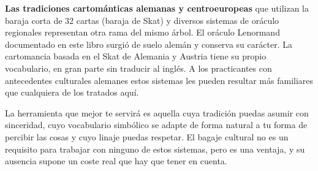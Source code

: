 \textbf{Las tradiciones cartománticas alemanas y centroeuropeas} que utilizan la baraja corta de 32 cartas (baraja de Skat) y diversos sistemas de oráculo regionales representan otra rama del mismo árbol. El oráculo Lenormand documentado en este libro surgió de suelo alemán y conserva su carácter. La cartomancia basada en el Skat de Alemania y Austria tiene su propio vocabulario, en gran parte sin traducir al inglés. A los practicantes con antecedentes culturales alemanes estos sistemas les pueden resultar más familiares que cualquiera de los tratados aquí.

La herramienta que mejor te servirá es aquella cuya tradición puedas asumir con sinceridad, cuyo vocabulario simbólico se adapte de forma natural a tu forma de percibir las cosas y cuyo linaje puedas respetar. El bagaje cultural no es un requisito para trabajar con ninguno de estos sistemas, pero es una ventaja, y su ausencia supone un coste real que hay que tener en cuenta.
